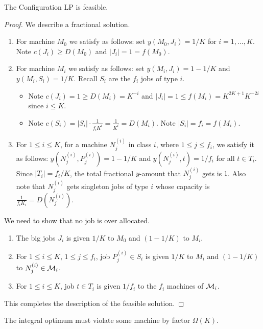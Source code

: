 	\begin{lemma}
		The Configuration LP is feasible.
	\end{lemma}
	\begin{proof}
		We describe a fractional solution.
		\begin{enumerate}
			\item For machine $M_0$ we satisfy as follows: set  $y(M_0,J_i) = 1/K$ for $i=1,\ldots,K$. Note $c(J_i) \geq D(M_0)$ and $|J_i| = 1 = f(M_0)$.
			\item For machine $M_i$ we satisfy as follows: set $y(M_i,J_i) = 1-1/K$ and $y(M_i,S_i) = 1/K$. Recall $S_i$ are the $f_i$ jobs of type $i$.
			\begin{itemize}
				\item Note $c(J_i) = 1 \geq D(M_i) = K^{-i}$ and 	$|J_i| = 1 \leq f(M_i) = K^{2K+1}K^{-2i}$ since $i\leq K$.
				\item Note $c(S_i) = |S_i|\cdot \frac{1}{f_iK^i} = \frac{1}{K^i} = D(M_i)$. Note $|S_i| = f_i = f(M_i)$.
			\end{itemize}
			\item For $1\leq i\leq K$, for a machine $N^{(i)}_j$ in class $i$, where $1\leq j\leq f_i$, we satisfy it as follows: $y(N^{(i)}_j, P^{(i)}_j) = 1-1/K$ and $y(N^{(i)}_j, t) = 1/f_i$ for all $t\in T_i$.
			Since $|T_i| = f_i/K$, the total fractional $y$-amount that $N^{(i)}_j$ gets is $1$. Also note that $N^{(i)}_j$ gets singleton jobs of type $i$ whose capacity is $\frac{1}{f_iK_i} = D(N^{(i)}_j)$.
		\end{enumerate}
		We need to show that no job is over allocated.
		\begin{enumerate}
			\item The big jobs $J_i$ is given $1/K$ to $M_0$ and $(1-1/K)$ to $M_i$.
			\item For $1\leq i\leq K$, $1\leq j\leq f_i$, job $P^{(i)}_j \in S_i$ is given $1/K$ to $M_i$ and $(1-1/K)$ to $N^{(i)}_j\in \mathcal{M}_i$.
			\item For $1\leq i\leq K$, job $t\in T_i$ is given $1/f_i$ to the $f_i$ machines of $\mathcal{M}_i$.
		\end{enumerate}
		This completes the description of the feasible solution.
	\end{proof}
	\begin{lemma}
		The integral optimum must violate some machine by factor $\Omega(K)$.
	\end{lemma}
